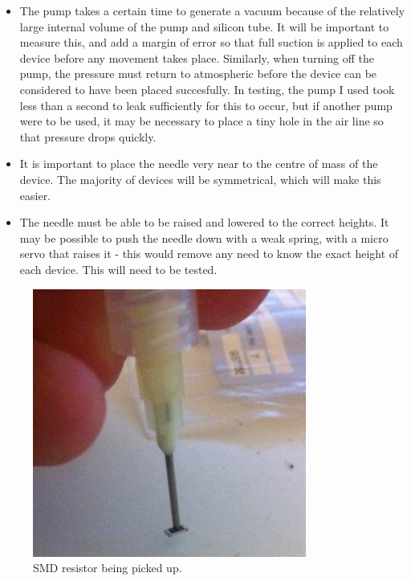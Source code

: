 \documentclass[a4paper,11pt]{article}  %
\begin{document}
\begin{itemize}
	\item	The pump takes a certain time to generate a vacuum because of the relatively large internal volume of the pump
		and silicon tube. It will be important to measure this, and add a margin of error so that full suction is applied
		to each device before any movement takes place. Similarly, when turning off the pump, the pressure must return to
		atmospheric before the device can be considered to have been placed succesfully. In testing, the pump I used took
		less than a second to leak sufficiently for this to occur, but if another pump were to be used, it may be necessary
		to place a tiny hole in the air line so that pressure drops quickly.
	\item	It is important to place the needle very near to the centre of mass of the device. The majority of devices will be
		symmetrical, which will make this easier.
	\item	The needle must be able to be raised and lowered to the correct heights. It may be possible to push the needle down
		with a weak spring, with a micro servo that raises it - this would remove any need to know the exact height of each
		device. This will need to be tested.
\end{itemize}

\begin{figure}[ht!]
\centering
\includegraphics[width=90mm]{resources/needle_with_resistor.jpg}
\caption{SMD resistor being picked up.}
\label{overflow}
\end{figure}
\end{document}
